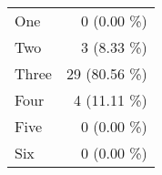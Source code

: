 \begin{tabular}{ l  r }
One & 0 (0.00 \%)\\
Two & 3 (8.33 \%)\\
Three & 29 (80.56 \%)\\
Four & 4 (11.11 \%)\\
Five & 0 (0.00 \%)\\
Six & 0 (0.00 \%)\\
\end{tabular}